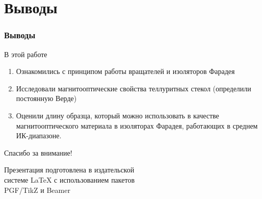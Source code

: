 \documentclass[10pt,pdf,hyperref={unicode}, dvipsnames]{beamer}
\begin{document}
\section{Выводы}
\begin{frame}
	\frametitle{Выводы}
	В этой работе 
	\begin{enumerate} 
		\item 
			  Ознакомились с принципом работы вращателей и изоляторов Фарадея
		\item 
		      Исследовали магнитооптические свойства теллуритных стекол (определили постоянную Верде)
		\item 
		      Оценили длину образца, который можно использовать в качестве магнитооптического материала в изоляторах Фарадея, работающих в среднем ИК-диапазоне.
	\end{enumerate}
\end{frame}


\begin{frame}[plain]
	\vspace{4cm}
	\begin{center}
		\Huge
		Спасибо за внимание!
	\end{center}
	\vspace{2.5cm}
	\begin{center}
		\color{black!30!white}
		Презентация подготовлена в издательской \\
		системе LaTeX с использованием пакетов \\
		PGF/TikZ и Beamer
	\end{center}
\end{frame}

\end{document}
